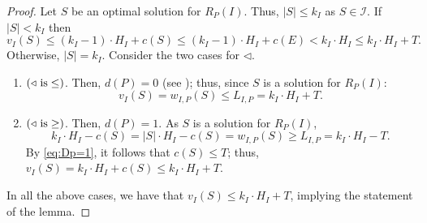 \documentclass[11pt,letter]{article}
\newcommand{\IS}{\textnormal{IS}}
\newcommand{\cI}{{\mathcal{I}}}
\begin{document}
\begin{proof}
	Let $S$ be an optimal solution for $R_P(I)$. Thus, $|S| \leq k_I$ as $S \in \cI$. If $|S| < k_I$ then
	 \begin{equation*}
			v_I(S) \leq (k_I-1) \cdot H_I+c(S) \leq (k_I-1) \cdot H_I+c(E) <k_I \cdot H_I \leq k_I \cdot H_I+T.
		\end{equation*}
	Otherwise, $|S| = k_I$. Consider the two cases for $\triangleleft$.
			\begin{enumerate}
		\item $(\triangleleft \textnormal{ is}   \leq)$. Then, $d(P) = 0$ (see ); thus, since $S$ is a solution for $R_P(I)$: $$v_I(S) = w_{I,P}(S) \leq L_{I,P} = k_I \cdot H_I+T.$$ 
		\item $(\triangleleft \textnormal{ is}   \geq)$. Then, $d(P) = 1$. As $S$ is a solution for $R_P(I)$,
		\begin{equation}
			\label{eq:Dp=1}
			  k_I \cdot H_I-c(S)=|S|\cdot H_I-c(S) =w_{I,P}(S) \geq L_{I,P} = k_I \cdot H_I-T.
		\end{equation} 
		By \eqref{eq:Dp=1}, it follows that $c(S) \leq T$; thus, $	v_I(S) = k_I \cdot H_I+c(S) \leq k_I \cdot H_I+T$. 
	\end{enumerate} 
	
In all the above cases, we have that $v_I(S) \leq k_I \cdot H_I+T$, implying the statement of the lemma. 
\end{proof}
\end{document}
